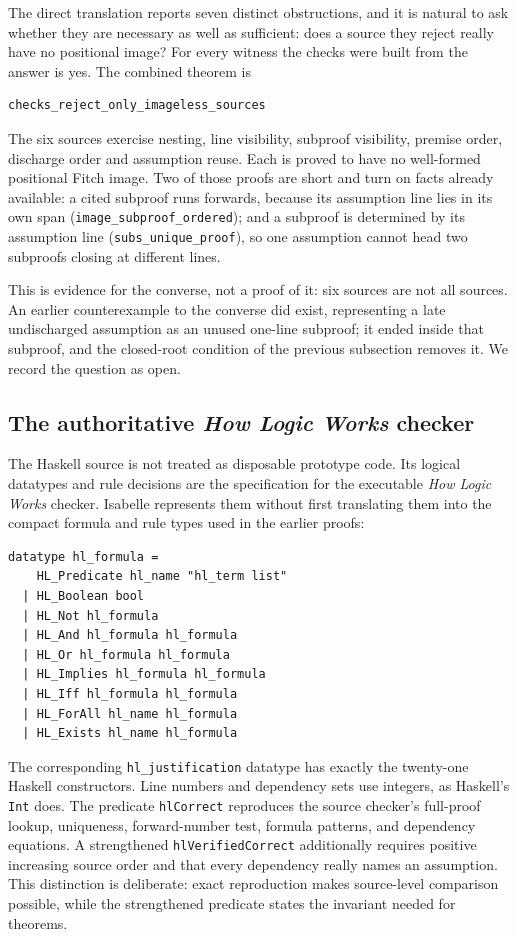 \documentclass[11pt]{article}
\theoremstyle{plain}
\theoremstyle{definition}
\theoremstyle{remark}
\begin{document}
The direct translation reports seven distinct obstructions, and it is natural
to ask whether they are necessary as well as sufficient: does a source they
reject really have no positional image? For every witness the checks were
built from the answer is yes. The combined theorem is
\begin{lstlisting}[language={}]
checks_reject_only_imageless_sources
\end{lstlisting}
\noindent The six sources exercise nesting, line visibility, subproof
visibility, premise order, discharge order and assumption reuse. Each is
proved to have no well-formed positional Fitch image.
Two of those proofs are short and turn on facts already available: a cited
subproof runs forwards, because its assumption line lies in its own span
(\verb|image_subproof_ordered|); and a subproof is determined by its
assumption line (\verb|subs_unique_proof|), so one assumption cannot head two
subproofs closing at different lines.

This is evidence for the converse, not a proof of it: six sources are not all
sources. An earlier counterexample to the converse did exist, representing a
late undischarged assumption as an unused one-line subproof; it ended inside
that subproof, and the closed-root condition of the previous subsection
removes it. We record the question as open.

\subsection{The authoritative \emph{How Logic Works} checker}

The Haskell source is not treated as disposable prototype code. Its logical
datatypes and rule decisions are the specification for the executable
\emph{How Logic Works} checker. Isabelle represents them without first
translating them into the compact formula and rule types used in the earlier
proofs:

\begin{lstlisting}[language={}]
datatype hl_formula =
    HL_Predicate hl_name "hl_term list"
  | HL_Boolean bool
  | HL_Not hl_formula
  | HL_And hl_formula hl_formula
  | HL_Or hl_formula hl_formula
  | HL_Implies hl_formula hl_formula
  | HL_Iff hl_formula hl_formula
  | HL_ForAll hl_name hl_formula
  | HL_Exists hl_name hl_formula
\end{lstlisting}

\noindent The corresponding \verb|hl_justification| datatype has exactly the
twenty-one Haskell constructors. Line numbers and dependency sets use
integers, as Haskell's \verb|Int| does. The predicate \verb|hlCorrect|
reproduces the source checker's full-proof lookup, uniqueness, forward-number
test, formula patterns, and dependency equations. A strengthened
\verb|hlVerifiedCorrect| additionally requires positive increasing source
order and that every dependency really names an assumption. This distinction
is deliberate: exact reproduction makes source-level comparison possible,
while the strengthened predicate states the invariant needed for theorems.
\end{document}
